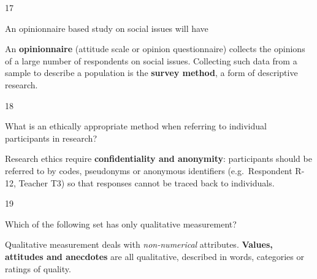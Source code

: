 \begin{question}{17}
{An opinionnaire based study on social issues will have\par}
\begin{explain}
An \textbf{opinionnaire} (attitude scale or opinion questionnaire) collects the opinions of a large number of respondents on social issues. Collecting such data from a sample to describe a population is the \textbf{survey method}, a form of descriptive research.
\end{explain}
\end{question}

\begin{question}{18}
{What is an ethically appropriate method when referring to individual participants in research?\par}
\begin{explain}
Research ethics require \textbf{confidentiality and anonymity}: participants should be referred to by codes, pseudonyms or anonymous identifiers (e.g.\ Respondent R-12, Teacher T3) so that responses cannot be traced back to individuals.
\end{explain}
\end{question}

\begin{question}{19}
{Which of the following set has only qualitative measurement?\par}
\begin{explain}
Qualitative measurement deals with \emph{non-numerical} attributes. \textbf{Values, attitudes and anecdotes} are all qualitative, described in words, categories or ratings of quality.
\end{explain}
\end{question}

